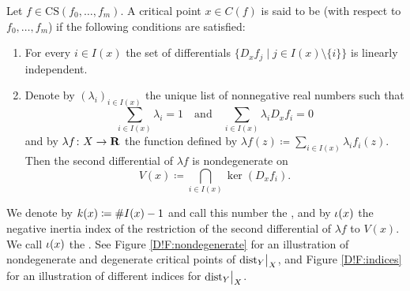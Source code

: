 \begin{definition}
\label{D!D:nondegenerate-crit-pt}
  Let $f\in \mathrm{CS}(f_0, \ldots, f_m)$. A critical point $x\in C(f)$ is said to be  (with respect to $f_0, \ldots, f_m$) if the following conditions are satisfied:
  \begin{enumerate}
    \item For every $i\in I(x)$ the set of differentials $\{D_x f_j \mid j\in I(x)\setminus \{i\}\}$ is linearly independent.
    \item Denote by $(\lambda_i)_{i\in I(x)}$ the unique list of nonnegative real numbers such that 
    \[
      \sum_{i \in I(x)} \lambda_i = 1
      \quad \textrm{and} \quad
      \sum_{i \in I(x)} \lambda_i D_x f_i = 0
    \]
    and by $\lambda f \colon X\to \mathbf{R}$ the function defined by $\lambda f(z)\coloneq\sum_{i\in I(x)}\lambda_if_i(z).$ Then the second differential of $\lambda f$ is nondegenerate on 
    \[
      V(x) \coloneq \bigcap_{i\in I(x)}\ker(D_xf_i).
    \]
  \end{enumerate}
  We denote by $k(x)\coloneq\#I(x)-1$ and call this number the , and by $\iota(x)$ the negative inertia index of the restriction of the second differential of $\lambda f$ to $V(x)$. We call $\iota(x)$ the . See Figure \ref{D!F:nondegenerate} for an illustration of nondegenerate and degenerate critical points of $\mathord{\operatorname{dist}}_Y\big|_X$, and Figure \ref{D!F:indices} for an illustration of different indices for $\mathord{\operatorname{dist}}_Y\big|_X$.

  \begin{figure}[tbp]
    \captionsetup[subfigure]{justification=centering}
    \begin{subfigure}[tbp]{.3\textwidth}
      \centering
\end{subfigure}
\end{figure}
\end{definition}
